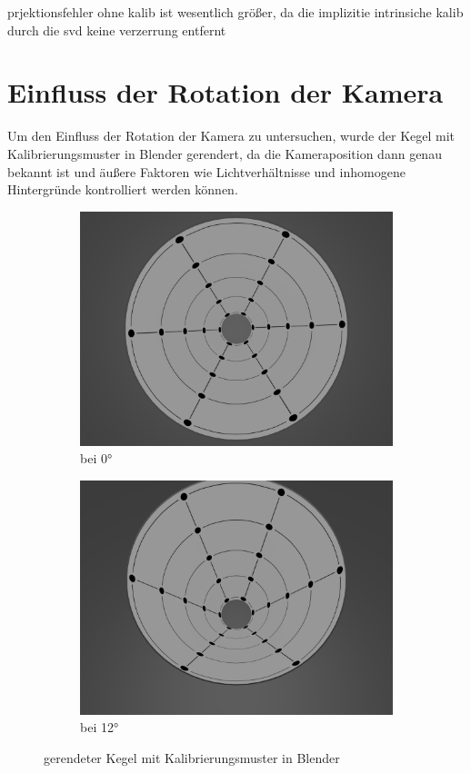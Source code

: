 prjektionsfehler ohne kalib ist wesentlich größer, da die implizitie intrinsiche kalib durch die svd keine verzerrung entfernt

\section{Einfluss der Rotation der Kamera}
Um den Einfluss der Rotation der Kamera zu untersuchen, wurde der Kegel mit Kalibrierungsmuster in Blender gerendert, da die Kameraposition dann genau bekannt ist und äußere Faktoren wie Lichtverhältnisse und inhomogene Hintergründe kontrolliert werden können. 

\begin{figure}[!htb]
	\centering
	\begin{subfigure}{.5\textwidth}
		\centering
		\includegraphics[width=.9\textwidth]{images/blender0.png}
		\caption{bei 0°}
	\end{subfigure}%
	\begin{subfigure}{.5\textwidth}
		\centering
		\includegraphics[width=.9\textwidth]{images/blender12.png}
		\caption{bei 12°}
	\end{subfigure}
	\label{fig:blender}
	\caption{gerendeter Kegel mit Kalibrierungsmuster in Blender}
\end{figure}



